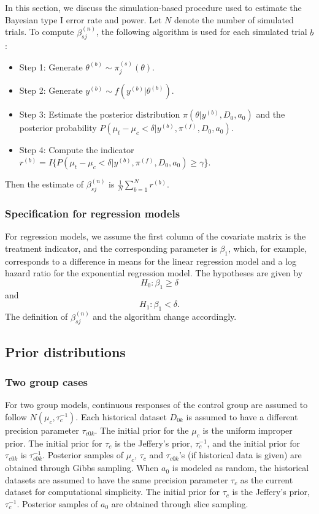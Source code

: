 In this section, we discuss the simulation-based procedure used to estimate the Bayesian type I error rate and power. Let $N$ denote the number of simulated trials. To compute $\beta_{sj}^{(n)}$, the following algorithm is used for each simulated trial $b$:
\begin{itemize}
\item{Step 1: }{Generate $\theta^{(b)} \sim \pi_j^{(s)}(\theta)$.}
\item{Step 2: }{Generate $y^{(b)} \sim f(y^{(b)}|\theta^{(b)})$.}
\item{Step 3: }{Estimate the posterior distribution $\pi(\theta|y^{(b)}, D_0, a_0)$ and the posterior probability $P(\mu_t - \mu_c < \delta|y^{(b)}, \pi^{(f)},D_0, a_0)$.}
\item{Step 4: }{Compute the indicator $r^{(b)}=I\{P(\mu_t - \mu_c < \delta|y^{(b)}, \pi^{(f)}, D_0, a_0) \ge \gamma$\}.}
\end{itemize}

Then the estimate of $\beta_{sj}^{(n)}$ is $\frac{1}{N}\sum_{b=1}^N r^{(b)}$. 


\subsubsection*{Specification for regression models}
For regression models, we assume the first column of the covariate matrix is the treatment indicator,
and the corresponding parameter is $\beta_1$, which, for example, corresponds to a difference in means for the linear regression model and a log hazard ratio for the exponential regression model.
The hypotheses are given by
$$H_0: \beta_1 \ge \delta$$ and $$H_1: \beta_1 < \delta.$$
The definition of $\beta_{sj}^{(n)}$ and the algorithm change accordingly.



\subsection*{Prior distributions}


\subsubsection*{Two group cases}

For two group models, continuous responses of the control group are assumed to follow $N(\mu_c, \tau_c^{-1})$. Each historical dataset $D_{0k}$ is assumed to have a different precision parameter $\tau_{c0k}$. The initial prior for the $\mu_c$ is the uniform improper prior. The initial prior for $\tau_c$ is the Jeffery’s prior, $\tau_c^{-1}$, and the initial prior for $\tau_{c0k}$ is $\tau_{c0k}^{-1}$. Posterior samples of $\mu_c$, $\tau_c$ and $\tau_{c0k}$'s (if historical data is given) are obtained through Gibbs sampling. When $a_0$ is modeled as random, the historical datasets are assumed to have the same precision parameter $\tau_c$ as the current dataset for computational simplicity. The initial prior for $\tau_c$ is the Jeffery’s prior, $\tau_c^{-1}$. Posterior samples of $a_0$ are obtained through slice sampling. 

